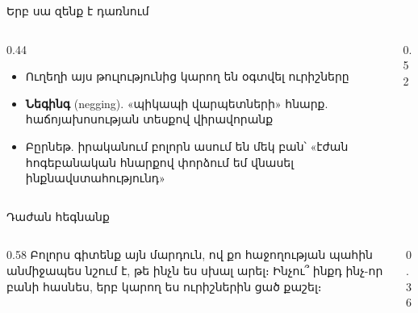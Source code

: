 \begin{frame}{Երբ սա զենք է դառնում}
  \begin{columns}[c]
    \begin{column}{0.44\textwidth}
      \begin{itemize}
        \item Ուղեղի այս թուլությունից կարող են օգտվել ուրիշները
        \item<2-> \textbf{Նեգինգ} (negging). «պիկապի վարպետների» հնարք. հաճոյախոսության տեսքով վիրավորանք
        \item<5-> Բըրնեթ. իրականում բոլորն ասում են մեկ բան՝ «էժան հոգեբանական հնարքով փորձում եմ վնասել ինքնավստահությունդ»
      \end{itemize}
    \end{column}
    \begin{column}{0.52\textwidth}
      \centering
    \end{column}
  \end{columns}
\end{frame}

\begin{frame}{Դաժան հեգնանք}
  \begin{columns}[c]
    \begin{column}{0.58\textwidth}
      Բոլորս գիտենք այն մարդուն, ով քո հաջողության պահին անմիջապես նշում է, թե ինչն ես սխալ արել։ Ինչու՞ ինքդ ինչ-որ բանի հասնես, երբ կարող ես ուրիշներին ցած քաշել։\par\medskip
    \end{column}
    \begin{column}{0.36\textwidth}
      \centering
    \end{column}
  \end{columns}
\end{frame}
